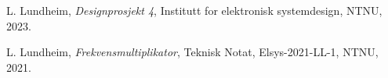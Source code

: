 
  L. Lundheim,
  \emph{Designprosjekt 4},
  Institutt for elektronisk systemdesign,
  NTNU,
  2023.

  L. Lundheim,
  \emph{Frekvensmultiplikator},
  Teknisk Notat,
  Elsys-2021-LL-1,
  NTNU,
  2021.


